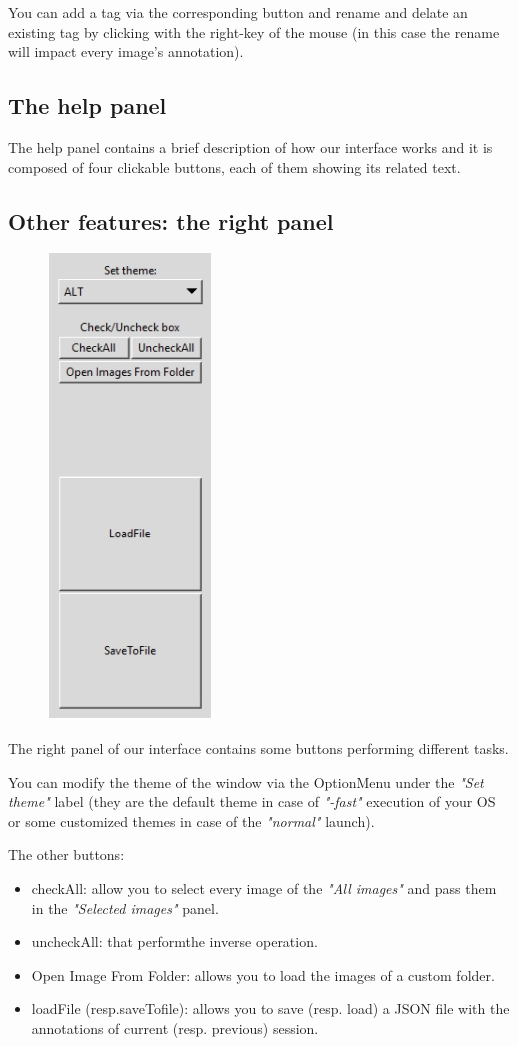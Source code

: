 \documentclass[a4paper, 11pt]{article}
\begin{document}
You can add a tag via the corresponding button and rename and delate an existing tag by clicking with the right-key of the mouse (in this case the rename will impact every image's annotation).
\subsection{The help panel}
The help panel contains a brief description of how our interface works and it is composed of four clickable buttons, each of them showing its related text. 
\subsection{Other features: the right panel}
\begin{figure}
  \includegraphics[scale=0.75]{images_latex/right_panel.jpg}
\end{figure}
The right panel of our interface contains some buttons performing different tasks.

You can modify the theme of the window via the OptionMenu under the \textit{"Set theme"} label (they are the default theme in case of \textit{"-fast"} execution of your OS or some customized themes in case of the \textit{"normal"} launch).

The other buttons:
\begin{itemize}
  \item checkAll: allow you to select every image of the \textit{"All images"} and pass them in the \textit{"Selected images"} panel.
  \item uncheckAll: that performthe inverse operation.
  \item Open Image From Folder: allows you to load the images of a custom folder.
  \item loadFile (resp.saveTofile): allows you to save (resp. load) a JSON file with the annotations of current (resp. previous) session.
\end{itemize}
\end{document}
